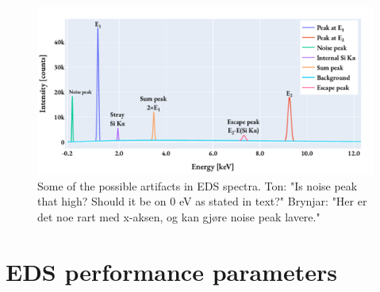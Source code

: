 \begin{figure}[htbp]
    \centering
    \includegraphics[width=0.95\linewidth]{figures/eds_artifacts.pdf}
    \caption{
        Some of the possible artifacts in EDS spectra.
        Ton: "Is noise peak that high? Should it be on 0 eV as stated in text?"
        Brynjar: "Her er det noe rart med x-aksen, og kan gjøre noise peak lavere."
    }
    \label{fig:eds_artifacts}
\end{figure}





\clearpage








































\section{EDS performance parameters}
\label{theory:eds_performance}




